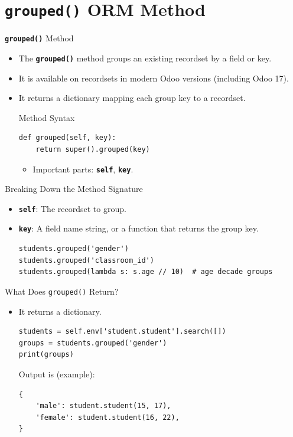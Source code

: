 
\section{\textbf{\texttt{grouped()}} ORM Method}

\begin{frame}[fragile]{\textbf{\texttt{grouped()}} Method}
	\begin{itemize}
		\item The \textbf{\texttt{grouped()}} method groups an existing recordset by a field or key.
		\item It is available on recordsets in modern Odoo versions (including Odoo 17).
		\item It returns a dictionary mapping each group key to a recordset.
\begin{block}{Method Syntax}
\begin{lstlisting}
def grouped(self, key):
	return super().grouped(key)
\end{lstlisting}
	\begin{itemize}
		\item Important parts: \textbf{\texttt{self}}, \textbf{\texttt{key}}.
	\end{itemize}
\end{block}
	\end{itemize}
\end{frame}

\begin{frame}[fragile]{Breaking Down the Method Signature}
	\begin{block}{}
		\begin{itemize}
			\item \textbf{\texttt{self}}: The recordset to group.
			\item \textbf{\texttt{key}}: A field name string, or a function that returns the group key.
\begin{lstlisting}
students.grouped('gender')
students.grouped('classroom_id')
students.grouped(lambda s: s.age // 10)  # age decade groups
\end{lstlisting}
		\end{itemize}
	\end{block}
\end{frame}

\begin{frame}[fragile]{What Does \texttt{grouped()} Return?}
	\begin{block}{}
		\begin{itemize}
			\item It returns a dictionary.
\begin{lstlisting}
students = self.env['student.student'].search([])
groups = students.grouped('gender')
print(groups)
\end{lstlisting}
			Output is (example):
\begin{lstlisting}
{
	'male': student.student(15, 17),
	'female': student.student(16, 22),
}
\end{lstlisting}
		\end{itemize}
	\end{block}
\end{frame}

